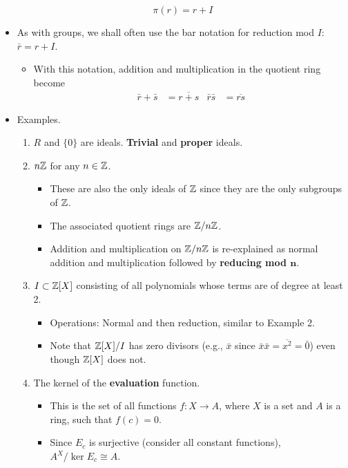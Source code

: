 \documentclass[../notes.tex]{subfiles}
\begin{document}
\begin{itemize}
    \begin{equation*}
        \pi(r) = r+I
    \end{equation*}
    \item As with groups, we shall often use the bar notation for reduction mod $I$: $\bar{r}=r+I$.
    \begin{itemize}
        \item With this notation, addition and multiplication in the quotient ring become
        \begin{align*}
            \bar{r}+\bar{s} &= \overline{r+s}&
            \bar{r}\bar{s} &= \overline{rs}
        \end{align*}
    \end{itemize}
    \item Examples.
    \begin{enumerate}
        \item $R$ and $\{0\}$ are ideals. \textbf{Trivial} and \textbf{proper} ideals.
        \item $n\mathbb{Z}$ for any $n\in\mathbb{Z}$.
        \begin{itemize}
            \item These are also the only ideals of $\mathbb{Z}$ since they are the only subgroups of $\mathbb{Z}$.
            \item The associated quotient rings are $\mathbb{Z}/n\mathbb{Z}$.
            \item Addition and multiplication on $\mathbb{Z}/n\mathbb{Z}$ is re-explained as normal addition and multiplication followed by \textbf{reducing mod $\bm{n}$}.
        \end{itemize}
        \item $I\subset\mathbb{Z}[X]$ consisting of all polynomials whose terms are of degree at least 2.
        \begin{itemize}
            \item Operations: Normal and then reduction, similar to Example 2.
            \item Note that $\mathbb{Z}[X]/I$ has zero divisors (e.g., $\bar{x}$ since $\bar{x}\bar{x}=\overline{x^2}=\bar{0}$) even though $\mathbb{Z}[X]$ does not.
        \end{itemize}
        \item The kernel of the \textbf{evaluation} function.
        \begin{itemize}
            \item This is the set of all functions $f:X\to A$, where $X$ is a set and $A$ is a ring, such that $f(c)=0$.
            \item Since $E_c$ is surjective (consider all constant functions), $A^X/\ker E_c\cong A$.

\end{itemize}
\end{enumerate}
\end{itemize}
\end{document}
